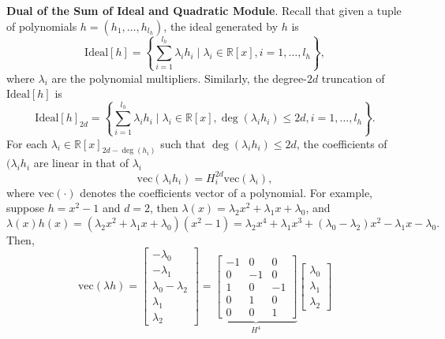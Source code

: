 \documentclass[
]{book}
\theoremstyle{definition}
\theoremstyle{definition}
\theoremstyle{definition}
\theoremstyle{definition}
\theoremstyle{remark}
\begin{document}
\textbf{Dual of the Sum of Ideal and Quadratic Module}. Recall that given a tuple of polynomials \(h=(h_1,\dots,h_{l_h})\), the ideal generated by \(h\) is
\[
\mathrm{Ideal}[h] =  \left\{ \sum_{i=1}^{l_h} \lambda_i h_i \mid \lambda_i \in \mathbb{R}[x],i=1,\dots,l_h \right\} ,
\]
where \(\lambda_i\) are the polynomial multipliers. Similarly, the degree-\(2d\) truncation of \(\mathrm{Ideal}[h]\) is
\begin{equation}
\mathrm{Ideal}[h]_{2d} =  \left\{  \sum_{i=1}^{l_h} \lambda_i h_i \mid \lambda_i \in \mathbb{R}[x], \deg(\lambda_i h_i) \leq 2d,i=1,\dots,l_h \right\} .
\label{eq:ideal-truncated-2d}
\end{equation}
For each \(\lambda_i \in \mathbb{R}[x]_{2d - \deg(h_i)}\) such that \(\deg(\lambda_i h_i) \leq 2d\), the coefficients of \((\lambda_i h_i\) are linear in that of \(\lambda_i\)
\[
\mathrm{vec}(\lambda_i h_i) = H_i^{2d} \mathrm{vec}(\lambda_i),
\]
where \(\mathrm{vec}(\cdot)\) denotes the coefficients vector of a polynomial. For example, suppose \(h = x^2-1\) and \(d = 2\), then \(\lambda(x) = \lambda_2 x^2 + \lambda_1 x + \lambda_0\), and
\[
\lambda(x) h(x) = (\lambda_2 x^2 + \lambda_1 x + \lambda_0)(x^2 - 1) = \lambda_2 x^4 + \lambda_1 x^3 + (\lambda_0 - \lambda_2) x^2 - \lambda_1 x - \lambda_0.
\]
Then,
\[
\mathrm{vec}(\lambda h) = \begin{bmatrix}
- \lambda_0 \\
- \lambda_1 \\
\lambda_0 - \lambda_2 \\
\lambda_1 \\
\lambda_2 \end{bmatrix} = 
\underbrace{\begin{bmatrix}
-1 & 0 & 0 \\
0 & -1 & 0 \\
1 & 0 & -1 \\
0 & 1 & 0 \\
0 & 0 & 1
\end{bmatrix}}_{H^4}
\begin{bmatrix}
\lambda_0 \\ \lambda_1 \\ \lambda_2 \end{bmatrix}
\]
\end{document}
